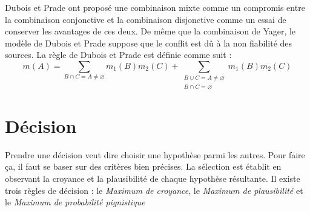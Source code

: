 Dubois et Prade ont proposé une combinaison mixte comme un compromis entre la
combinaison conjonctive et la combinaison disjonctive comme un essai de conserver
les avantages de ces deux. De même que la combinaison de  Yager, le modèle de Dubois
et Prade suppose que le conflit est dû à la non fiabilité des sources. La règle de
Dubois et Prade est définie comme suit :
\begin{equation}
m(A) = \sum_{B \cap C = A \neq \varnothing} m_1(B) m_2(C) +
\sum_{\substack{B \cup C = A \neq \varnothing \\ B \cap C = \varnothing}} m_1(B) m_2(C)
\end{equation}

\section{Décision}

Prendre une décision veut dire choisir une hypothèse parmi les autres. Pour faire ça,
il faut se baser sur des critères bien précises. La sélection est établit en observant
la croyance et la plausibilité de chaque hypothèse résultante. Il existe trois règles
de décision : le \emph{Maximum de croyance}, le \emph{Maximum de plausibilité} et le
\emph{Maximum de probabilité pignistique}
